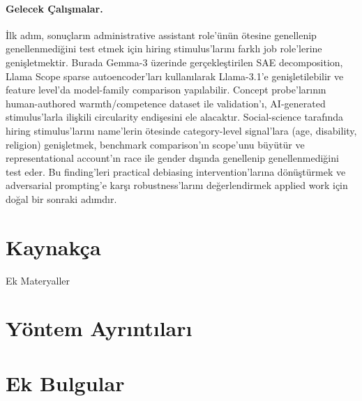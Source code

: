 \documentclass[twocolumn]{article}
\begin{document}
\paragraph{Gelecek Çalışmalar.}
İlk adım, sonuçların administrative assistant role'ünün ötesine genellenip
genellenmediğini test etmek için hiring stimulus'larını farklı job role'lerine
genişletmektir. Burada Gemma-3 üzerinde gerçekleştirilen SAE decomposition,
Llama Scope sparse autoencoder'ları \citep{lindsey2025llama} kullanılarak
Llama-3.1'e genişletilebilir ve feature level'da model-family comparison
yapılabilir. Concept probe'larının human-authored warmth/competence dataset ile
validation'ı, AI-generated stimulus'larla ilişkili circularity endişesini ele
alacaktır. Social-science tarafında hiring stimulus'larını name'lerin ötesinde
category-level signal'lara (age, disability, religion) genişletmek, benchmark
comparison'ın scope'unu büyütür ve representational account'ın race ile gender
dışında genellenip genellenmediğini test eder. Bu finding'leri practical
debiasing intervention'larına dönüştürmek ve adversarial prompting'e karşı
robustness'larını değerlendirmek applied work için doğal bir sonraki adımdır.

{
\footnotesize
\setlength{\bibitemsep}{-0.5ex}

\clearpage
\section*{Kaynakça}
\begin{otherlanguage}{english}
\printbibliography[heading=none]
\end{otherlanguage}
}

\clearpage
\begin{appendices}
\onecolumn
\setcounter{figure}{0}
\setcounter{table}{0}
\renewcommand{\thesection}{\Alph{section}}%
\renewcommand{\thesubsection}{\thesection.\arabic{subsection}}
\renewcommand\thefigure{S.\arabic{figure}}
\renewcommand\thetable{S.\arabic{table}}
\begin{center}
    \begin{minipage}{\textwidth}
        \centering
        \fontsize{16}{20}\selectfont
        Ek Materyaller
    \end{minipage}
\end{center}
\vspace{.5cm}

\section*{Yöntem Ayrıntıları}
\label{apx:methods}

\section*{Ek Bulgular}

\end{appendices}
\end{document}

